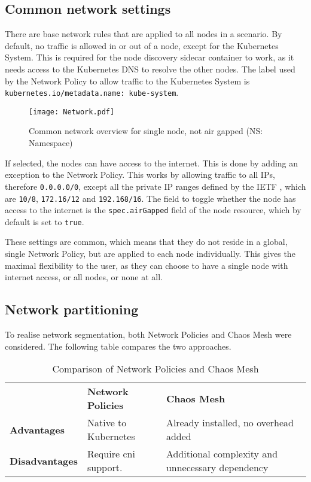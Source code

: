\subsection{Common network settings}

There are base network rules that are applied to all nodes in a scenario.
By default, no traffic is allowed in or out of a node, except for the Kubernetes System.
This is required for the node discovery sidecar container to work, as it needs access to the Kubernetes DNS to resolve the other nodes.
The label used by the Network Policy to allow traffic to the Kubernetes System is \verb|kubernetes.io/metadata.name: kube-system|.

\begin{figure}[H]
  \label{fig:node-network}
  \caption{Common network overview for single node, not air gapped (NS: Namespace)}
  \centering
  \texttt{[image: Network.pdf]}
\end{figure}

If selected, the nodes can have access to the internet. This is done by adding an exception to the Network Policy. This works by allowing traffic to all IPs, therefore \verb|0.0.0.0/0|, except all the private IP ranges defined by the IETF \cite{rfc1918}, which are \verb|10/8|, \verb|172.16/12| and \verb|192.168/16|. The field to toggle whether the node has access to the internet is the \verb|spec.airGapped| field of the node resource, which by default is set to \verb|true|.

These settings are common, which means that they do not reside in a global, single Network Policy, but are applied to each node individually. This gives the maximal flexibility to the user, as they can choose to have a single node with internet access, or all nodes, or none at all.

\subsection{Network partitioning}

To realise network segmentation, both Network Policies and Chaos Mesh were considered. The following table compares the two approaches.

\begin{table}[H]
  \centering
  \begin{tabular}{|l|l|l|}
    \hline
                           & \textbf{Network Policies} & \textbf{Chaos Mesh}                              \\ \cline{2-3}
    \textbf{Advantages}    & Native to Kubernetes      & Already installed, no overhead added             \\ \hline
    \textbf{Disadvantages} & Require \ac{cni} support. & Additional complexity and unnecessary dependency \\ \hline
  \end{tabular}
  \caption{Comparison of Network Policies and Chaos Mesh}
  \label{tab:network-policies-vs-chaos-mesh}
\end{table}

